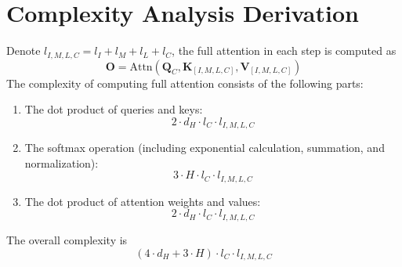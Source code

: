 \onecolumn

\section{Complexity Analysis Derivation}
\label{sec:Complexity_Analysis_Proof}


Denote $l_{I,M,L,C} = l_{I} + l_{M} + l_{L} + l_{C}$, the full attention in each step is computed as
\begin{equation} \label{attention_eq_full}
	\mathbf{O} = \text{Attn}(\mathbf{Q}_C,\mathbf{K}_{[I,M,L,C]}, \mathbf{V}_{[I,M,L,C]})
\end{equation}
The complexity of computing full attention consists of the following parts: 
\begin{enumerate}
\item The dot product of queries and keys: 
\begin{equation} \label{attn_comple_dot}
  2 \cdot d_{H} \cdot l_{C} \cdot l_{I,M,L,C} 
\end{equation}
\item The softmax operation (including exponential calculation, summation, and normalization): 
\begin{equation} \label{attn_comple_softmax}
  3 \cdot H \cdot l_{C} \cdot l_{I,M,L,C}
\end{equation}
\item The dot product of attention weights and values: 
\begin{equation} \label{attn_comple_wei_val}
  2 \cdot d_{H} \cdot l_{C} \cdot l_{I,M,L,C}
\end{equation}
\end{enumerate}

The overall complexity is
\begin{equation} \label{attn_full}
  (4 \cdot d_{H} + 3 \cdot H) \cdot l_{C} \cdot l_{I,M,L,C} 
\end{equation}


